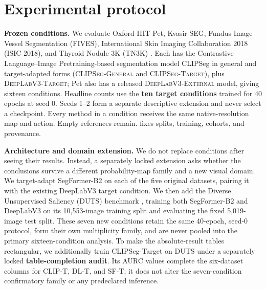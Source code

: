 \section{Experimental protocol}
\label{sec:experiments}

\noindent\textbf{Frozen conditions.}
We evaluate Oxford-IIIT Pet, Kvasir-SEG, Fundus Image Vessel Segmentation
(FIVES), International Skin Imaging Collaboration 2018 (ISIC 2018), and
Thyroid Nodule 3K (TN3K)
\citep{parkhi2012cats,jha2020kvasir,jin2022fives,codella2019isic,
gong2023thyroid}. Each has the Contrastive Language--Image Pretraining-based
segmentation model CLIPSeg in general and target-adapted forms
(\textsc{CLIPSeg-General} and \textsc{CLIPSeg-Target}), plus
\textsc{DeepLabV3-Target}; Pet also has a released
\textsc{DeepLabV3-External} model, giving sixteen conditions. Headline counts
use the \textbf{ten target conditions} trained for 40 epochs at seed 0. Seeds 1--2 form a
separate descriptive extension and never select a checkpoint. Every method in a
condition receives the same native-resolution map and action. Empty references
remain.  fixes splits, training, cohorts,
and provenance.

\noindent\textbf{Architecture and domain extension.}
We do not replace conditions after seeing their results. Instead, a separately
locked extension asks whether the conclusions survive a different probability-map
family and a new visual domain. We target-adapt SegFormer-B2
\citep{xie2021segformer} on each of the five original datasets, pairing it with
the existing DeepLabV3 target condition. We then add the Diverse Unsupervised
Saliency (DUTS) benchmark \citep{wang2017duts}, training both SegFormer-B2 and
DeepLabV3 on its 10,553-image training split and evaluating the fixed 5,019-image
test split. These seven new conditions retain the same 40-epoch, seed-0 protocol,
form their own multiplicity family, and are never pooled into the primary
sixteen-condition analysis. To make the absolute-result tables rectangular,
we additionally train CLIPSeg-Target on DUTS under a separately locked
\textbf{table-completion audit}. Its AURC values complete the six-dataset columns
for CLIP-T, DL-T, and SF-T; it does not alter the seven-condition confirmatory
family or any predeclared inference.

